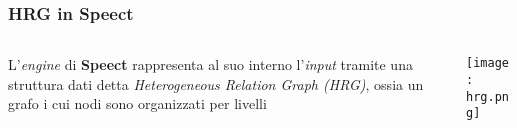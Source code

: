 \begin{frame}
  \frametitle{HRG in Speect}
  \begin{columns}
    \begin{column}{0.4\textwidth}
      L'\textit{engine} di \textbf{Speect} rappresenta al suo interno l'\textit{input} 
      tramite una struttura dati detta \textit{Heterogeneous Relation Graph (HRG)}, 
      ossia un grafo i cui nodi sono organizzati per livelli
    \end{column}
    \begin{column}{0.6\textwidth}
      \texttt{[image: hrg.png]}
    \end{column}	
  \end{columns}
\end{frame}
